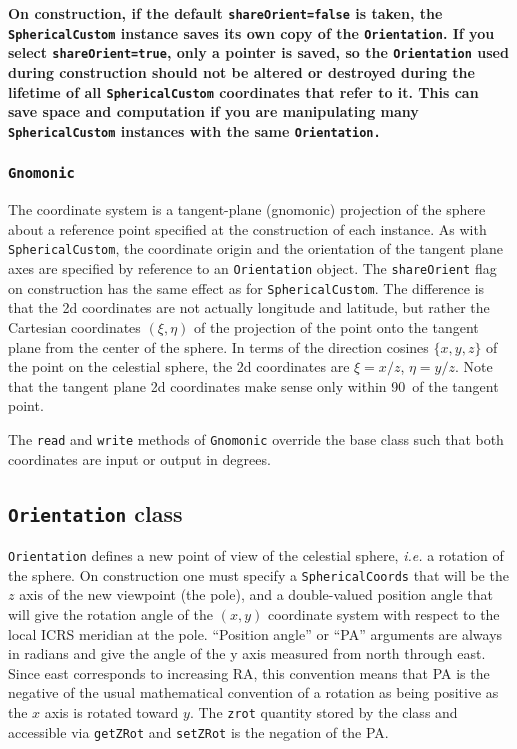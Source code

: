 \documentclass[11pt,preprint,flushrt]{aastex}
\begin{document}
{\bf On construction, if the default {\tt shareOrient=false} is taken, the {\tt SphericalCustom} instance saves its own copy of the {\tt Orientation}.  If you select {\tt shareOrient=true}, only a pointer is saved, so the {\tt Orientation} used during construction should not be altered or destroyed during the lifetime of all {\tt SphericalCustom} coordinates that refer to it.  This can save space and computation if you are manipulating many {\tt SphericalCustom} instances with the same {\tt Orientation.}}

\subsubsection{\tt Gnomonic}
The coordinate system is a tangent-plane (gnomonic) projection of the sphere about a reference point specified at the construction of each instance.  As with {\tt SphericalCustom}, the coordinate origin and the orientation of the tangent plane axes are specified by reference to an {\tt Orientation} object.  The {\tt shareOrient} flag on construction has the same effect as for {\tt SphericalCustom}.
 The difference is that the 2d coordinates are not actually longitude and latitude, but rather the Cartesian coordinates $(\xi,\eta)$ of the projection of the point onto the tangent plane from the center of the sphere.  In terms of the direction cosines $\{x,y,z\}$ of the point on the celestial sphere, the 2d coordinates are $\xi=x/z$, $\eta=y/z$.  Note that the tangent plane 2d coordinates make sense only within 90\arcdeg\ of the tangent point.

The {\tt read} and {\tt write} methods of {\tt Gnomonic} override the base class such that both coordinates are input or output in degrees.

\subsection{{\tt Orientation} class}
{\tt Orientation} defines a new point of view of the celestial sphere, {\it i.e.} a rotation of the sphere.  On construction one must specify a {\tt SphericalCoords} that will be the $z$ axis of the new viewpoint (the pole), and a double-valued position angle that will give the rotation angle of the $(x,y)$ coordinate system with respect to the local ICRS meridian at the pole.  ``Position angle'' or ``PA'' arguments are always in radians and give the angle of the y axis measured from north through east.  Since east corresponds to increasing RA, this convention means that PA is the negative of the usual mathematical convention of a rotation as being positive as the $x$ axis is rotated toward $y$.  The {\tt zrot} quantity stored by the class and accessible via {\tt getZRot} and {\tt setZRot} is the negation of the PA.
\end{document}
